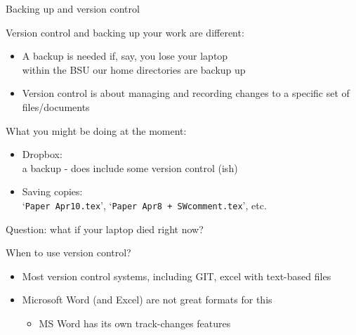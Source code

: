 \begin{frame}{Backing up and version control}

  Version control and backing up your work are different:
  
  \begin{itemize}

  \item A backup is needed if, say, you lose your laptop\\within the
    BSU our home directories are backup up
  \item Version control is about managing and recording changes to a specific set of files/documents
  \end{itemize}

  \pause

  What you might be doing at the moment:

  \begin{itemize}
  \item {Dropbox:}\\a backup - does include some version
    control (ish)
  \item {Saving copies:}\\`\texttt{Paper Apr10.tex}', `\texttt{Paper Apr8 +
      SWcomment.tex}', etc.
  \end{itemize}

  \pause

  \alert{Question: what if your laptop died right now?}

\end{frame}


\begin{frame}{When to use version control?}
  
  \begin{itemize}
  \item Most version control systems, including GIT, excel with
    text-based files
  \item Microsoft Word (and Excel) are not great formats for this
    \begin{itemize}
    \item MS Word has its own track-changes features
    \end{itemize}
  \end{itemize}


\end{frame}


